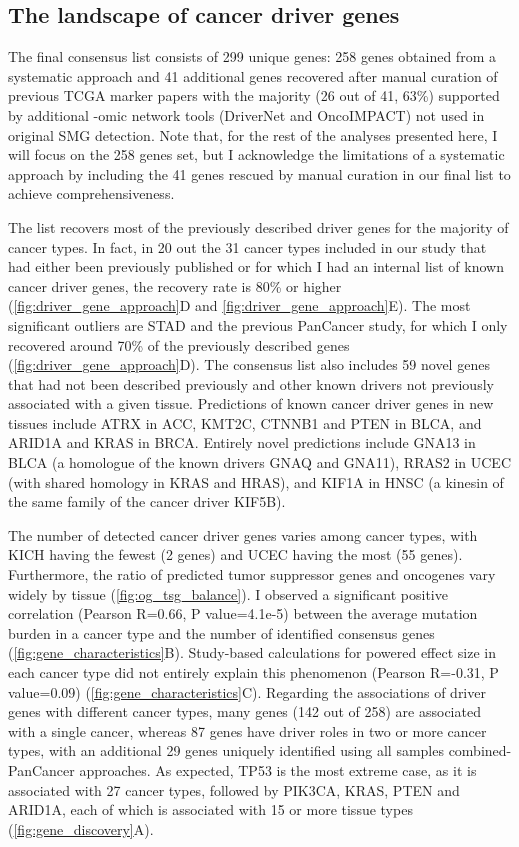 \subsection{The landscape of cancer driver genes}
The final consensus list consists of 299 unique genes: 258 genes obtained from a systematic approach and 41 additional genes recovered after manual curation of previous TCGA marker papers with the majority (26 out of 41, 63\%) supported by additional -omic network tools (DriverNet and OncoIMPACT) not used in original SMG detection. Note that, for the rest of the analyses presented here, I will focus on the 258 genes set, but I acknowledge the limitations of a systematic approach by including the 41 genes rescued by manual curation in our final list to achieve comprehensiveness.

The list recovers most of the previously described driver genes for the majority of cancer types. In fact, in 20 out the 31 cancer types included in our study that had either been previously published or for which I had an internal list of known cancer driver genes, the recovery rate is 80\% or higher (\autoref{fig:driver_gene_approach}D and \autoref{fig:driver_gene_approach}E). The most significant outliers are STAD and the previous PanCancer study, for which I only recovered around 70\% of the previously described genes (\autoref{fig:driver_gene_approach}D). The consensus list also includes 59 novel genes that had not been described previously and other known drivers not previously associated with a given tissue. Predictions of known cancer driver genes in new tissues include ATRX in ACC, KMT2C, CTNNB1 and PTEN in BLCA, and ARID1A and KRAS in BRCA. Entirely novel predictions include GNA13 in BLCA (a homologue of the known drivers GNAQ and GNA11), RRAS2 in UCEC (with shared homology in KRAS and HRAS), and KIF1A in HNSC (a kinesin of the same family of the cancer driver KIF5B). 

The number of detected cancer driver genes varies among cancer types, with KICH having the fewest (2 genes) and UCEC having the most (55 genes). Furthermore, the ratio of predicted tumor suppressor genes and oncogenes vary widely by tissue (\autoref{fig:og_tsg_balance}). I observed a significant positive correlation (Pearson R=0.66, P value=4.1e-5) between the average mutation burden in a cancer type and the number of identified consensus genes (\autoref{fig:gene_characteristics}B). Study-based calculations for powered effect size in each cancer type did not entirely explain this phenomenon (Pearson R=-0.31, P value=0.09) (\autoref{fig:gene_characteristics}C). Regarding the associations of driver genes with different cancer types, many genes (142 out of 258) are associated with a single cancer, whereas 87 genes have driver roles in two or more cancer types, with an additional 29 genes uniquely identified using all samples combined-PanCancer approaches. As expected, TP53 is the most extreme case, as it is associated with 27 cancer types, followed by PIK3CA, KRAS, PTEN and ARID1A, each of which is associated with 15 or more tissue types (\autoref{fig:gene_discovery}A).

